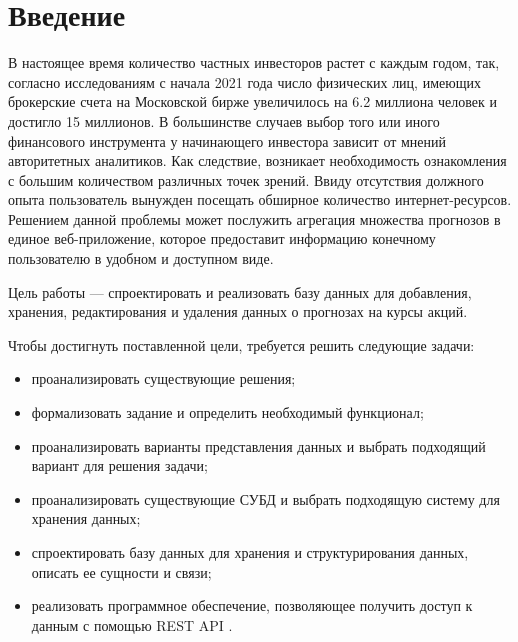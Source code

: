 \chapter*{Введение}

В настоящее время количество частных инвесторов растет с каждым годом, так, согласно исследованиям \cite{moex} с начала 2021 года число физических лиц, имеющих брокерские счета на Московской бирже увеличилось на 6.2 миллиона человек и достигло 15 миллионов. В большинстве случаев выбор того или иного финансового инструмента у начинающего инвестора зависит от мнений авторитетных аналитиков. Как следствие, возникает необходимость ознакомления с большим количеством различных точек зрений. Ввиду отсутствия должного опыта пользователь вынужден посещать обширное количество интернет-ресурсов. Решением данной проблемы может послужить агрегация множества прогнозов в единое веб-приложение, которое предоставит информацию конечному пользователю в удобном и доступном виде.

Цель работы --- спроектировать и реализовать базу данных для добавления, хранения, редактирования и удаления данных о прогнозах на курсы акций.

Чтобы достигнуть поставленной цели, требуется решить следующие задачи:

\begin{itemize}
    \item проанализировать существующие решения;
    \item формализовать задание и определить необходимый функционал;
    \item проанализировать варианты представления данных и выбрать подходящий вариант для решения задачи;
    \item проанализировать существующие СУБД и выбрать подходящую систему для хранения данных;
    \item спроектировать базу данных для хранения и структурирования данных, описать ее сущности и связи;
    \item реализовать программное обеспечение, позволяющее получить доступ к данным с помощью REST API \cite{rest-api}.
\end{itemize}
